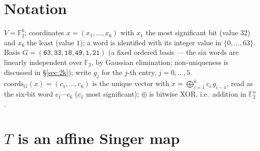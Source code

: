 \documentclass[11pt]{article}
\begin{document}
\section{Notation}\label{sec:not}
$V=\mathbb{F}_2^6$; coordinates $x=(x_1,\dots,x_6)$ with $x_1$ the most significant
bit (value $32$) and $x_6$ the least (value $1$); a word is identified with its
integer value in $\{0,\dots,63\}$. Basis $G=(\texttt{63},\texttt{33},\texttt{18},
\texttt{49},\texttt{1},\texttt{21})$ (a fixed ordered basis --- the six words are linearly independent over $\mathbb{F}_2$, by Gaussian elimination; non-uniqueness is discussed in \S\ref{sec:2k}); write $g_j$ for
the $j$-th entry, $j=0,\dots,5$.
$\mathrm{coords}_G(x)=(c_1,\dots,c_6)$ is the unique vector with
$x=\bigoplus_{i=1}^6 c_i\,g_{i-1}$, read as the six-bit word $c_1\cdots c_6$
($c_1$ most significant); $\oplus$ is bitwise XOR, i.e.~addition in $\mathbb{F}_2^n$.

\section[Affine Singer map]{$T$ is an affine Singer map}\label{sec:T}
\end{document}
